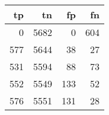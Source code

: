 \begin{tabular}{rrrr}
\toprule
tp & tn & fp & fn \\
\midrule
0 & 5682 & 0 & 604 \\
577 & 5644 & 38 & 27 \\
531 & 5594 & 88 & 73 \\
552 & 5549 & 133 & 52 \\
576 & 5551 & 131 & 28 \\
\bottomrule
\end{tabular}
